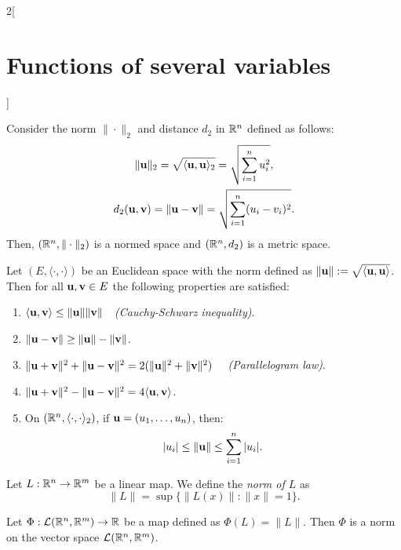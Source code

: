 \documentclass[../../../main.tex]{subfiles}
\begin{document}
\begin{multicols}{2}[\section{Functions of several variables}]
\begin{corollary}
        Consider the norm $\|\cdot\|_2$ and distance $d_2$ in $\mathbb{R}^n$ defined as follows:
        \begin{gather*}
            \|\vb{u}\|_2=\sqrt{\langle \vb{u},\vb{u}\rangle_2}=\sqrt{\sum_{i=1}^nu_i^2},\\
            d_2(\vb{u},\vb{v})=\|\vb{u}-\vb{v}\|=\sqrt{\sum_{i=1}^n(u_i-v_i)^2}.
        \end{gather*}
        Then, $(\mathbb{R}^n,\|\cdot\|_2)$ is a normed space and $(\mathbb{R}^n,d_2)$ is a metric space.
    \end{corollary}
    \begin{prop}
        Let $(E,\langle\cdot,\cdot\rangle)$ be an Euclidean space with the norm defined as $\|\vb{u}\|:=\sqrt{\langle \vb{u},\vb{u}\rangle}$. Then for all $\vb{u},\vb{v}\in E$ the following properties are satisfied:
        \begin{enumerate}
            \item $\langle \vb{u},\vb{v}\rangle\leq\|\vb{u}\|\|\vb{v}\|\quad$\textit{(Cauchy-Schwarz inequality)}.
            \item $\|\vb{u}-\vb{v}\|\geq\|\vb{u}\|-\|\vb{v}\|$.
            \item $\|\vb{u}+\vb{v}\|^2+\|\vb{u}-\vb{v}\|^2=2(\|\vb{u}\|^2+\|\vb{v}\|^2)\quad$ \textit{(Parallelogram law)}.
            \item $\|\vb{u}+\vb{v}\|^2-\|\vb{u}-\vb{v}\|^2=4\langle \vb{u},\vb{v}\rangle$.
            \item On $(\mathbb{R}^n,\langle\cdot,\cdot\rangle_2)$, if $\vb{u}=(u_1,\ldots,u_n)$, then: $$|u_i|\leq\|\vb{u}\|\leq\sum_{i=1}^n|u_i|.$$
        \end{enumerate}
    \end{prop}
    \begin{definition}
        Let $L:\mathbb{R}^n\rightarrow\mathbb{R}^m$ be a linear map. We define the \textit{norm of $L$} as $$\|L\|=\sup\{\|L(x)\|:\|x\|=1\}.$$
    \end{definition}
    \begin{lemma}
        Let $\Phi:\mathcal{L}(\mathbb{R}^n,\mathbb{R}^m)\rightarrow\mathbb{R} $ be a map defined as $\Phi(L)=\|L\|$. Then $\Phi$ is a norm on the vector space $\mathcal{L}(\mathbb{R}^n,\mathbb{R}^m)$.
    \end{lemma}
    \begin{prop}

\end{prop}
\end{multicols}
\end{document}

